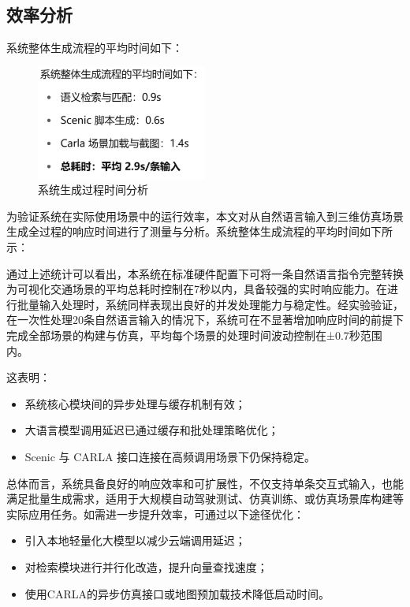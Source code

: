 \subsection{效率分析}
系统整体生成流程的平均时间如下：
\begin{figure}[h]
	\centering
	\includegraphics[width=0.5\textwidth]{"images/picture2.pdf"}
	\caption{系统生成过程时间分析}
	\label{fig:efficiency_analysis}
\end{figure}

为验证系统在实际使用场景中的运行效率，本文对从自然语言输入到三维仿真场景生成全过程的响应时间进行了测量与分析。系统整体生成流程的平均时间如下所示：

通过上述统计可以看出，本系统在标准硬件配置下可将一条自然语言指令完整转换为可视化交通场景的平均总耗时控制在7秒以内，具备较强的实时响应能力。在进行批量输入处理时，系统同样表现出良好的并发处理能力与稳定性。经实验验证，在一次性处理20条自然语言输入的情况下，系统可在不显著增加响应时间的前提下完成全部场景的构建与仿真，平均每个场景的处理时间波动控制在±0.7秒范围内。

这表明：
\begin{itemize}
	\item 系统核心模块间的异步处理与缓存机制有效；
	\item 大语言模型调用延迟已通过缓存和批处理策略优化；
	\item Scenic 与 CARLA 接口连接在高频调用场景下仍保持稳定。
\end{itemize}

总体而言，系统具备良好的响应效率和可扩展性，不仅支持单条交互式输入，也能满足批量生成需求，适用于大规模自动驾驶测试、仿真训练、或仿真场景库构建等实际应用任务。如需进一步提升效率，可通过以下途径优化：
\begin{itemize}
	\item 引入本地轻量化大模型以减少云端调用延迟；
	\item 对检索模块进行并行化改造，提升向量查找速度；
	\item 使用CARLA的异步仿真接口或地图预加载技术降低启动时间。
\end{itemize}
